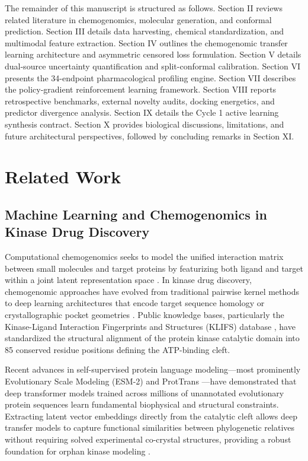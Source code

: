 \documentclass[journal]{IEEEtran}
\begin{document}
The remainder of this manuscript is structured as follows. Section II reviews related literature in chemogenomics, molecular generation, and conformal prediction. Section III details data harvesting, chemical standardization, and multimodal feature extraction. Section IV outlines the chemogenomic transfer learning architecture and asymmetric censored loss formulation. Section V details dual-source uncertainty quantification and split-conformal calibration. Section VI presents the 34-endpoint pharmacological profiling engine. Section VII describes the policy-gradient reinforcement learning framework. Section VIII reports retrospective benchmarks, external novelty audits, docking energetics, and predictor divergence analysis. Section IX details the Cycle 1 active learning synthesis contract. Section X provides biological discussions, limitations, and future architectural perspectives, followed by concluding remarks in Section XI.

\section{Related Work}

\subsection{Machine Learning and Chemogenomics in Kinase Drug Discovery}
Computational chemogenomics seeks to model the unified interaction matrix between small molecules and target proteins by featurizing both ligand and target within a joint latent representation space \cite{van2018chemogenomics, cances2020deep}. In kinase drug discovery, chemogenomic approaches have evolved from traditional pairwise kernel methods to deep learning architectures that encode target sequence homology or crystallographic pocket geometries \cite{merget2017profiling, christmann2016multi}. Public knowledge bases, particularly the Kinase-Ligand Interaction Fingerprints and Structures (KLIFS) database \cite{klifs2021}, have standardized the structural alignment of the protein kinase catalytic domain into 85 conserved residue positions defining the ATP-binding cleft.

Recent advances in self-supervised protein language modeling—most prominently Evolutionary Scale Modeling (ESM-2) \cite{lin2023evolutionary} and ProtTrans \cite{elnaggar2021prottrans}—have demonstrated that deep transformer models trained across millions of unannotated evolutionary protein sequences learn fundamental biophysical and structural constraints. Extracting latent vector embeddings directly from the catalytic cleft allows deep transfer models to capture functional similarities between phylogenetic relatives without requiring solved experimental co-crystal structures, providing a robust foundation for orphan kinase modeling \cite{brandes2022protein}.
\end{document}
